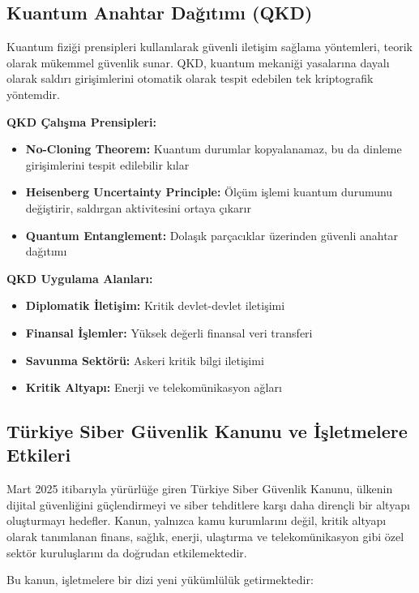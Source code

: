 \subsection{Kuantum Anahtar Dağıtımı (QKD)}

Kuantum fiziği prensipleri kullanılarak güvenli iletişim sağlama yöntemleri, teorik olarak mükemmel güvenlik sunar. QKD, kuantum mekaniği yasalarına dayalı olarak saldırı girişimlerini otomatik olarak tespit edebilen tek kriptografik yöntemdir.

\textbf{QKD Çalışma Prensipleri:}
\begin{itemize}
    \item \textbf{No-Cloning Theorem:} Kuantum durumlar kopyalanamaz, bu da dinleme girişimlerini tespit edilebilir kılar
    \item \textbf{Heisenberg Uncertainty Principle:} Ölçüm işlemi kuantum durumunu değiştirir, saldırgan aktivitesini ortaya çıkarır
    \item \textbf{Quantum Entanglement:} Dolaşık parçacıklar üzerinden güvenli anahtar dağıtımı
\end{itemize}

\textbf{QKD Uygulama Alanları:}
\begin{itemize}
    \item \textbf{Diplomatik İletişim:} Kritik devlet-devlet iletişimi
    \item \textbf{Finansal İşlemler:} Yüksek değerli finansal veri transferi
    \item \textbf{Savunma Sektörü:} Askeri kritik bilgi iletişimi
    \item \textbf{Kritik Altyapı:} Enerji ve telekomünikasyon ağları
\end{itemize}

\subsection{Türkiye Siber Güvenlik Kanunu ve İşletmelere Etkileri}

Mart 2025 itibarıyla yürürlüğe giren Türkiye Siber Güvenlik Kanunu, ülkenin dijital güvenliğini güçlendirmeyi ve siber tehditlere karşı daha dirençli bir altyapı oluşturmayı hedefler. Kanun, yalnızca kamu kurumlarını değil, kritik altyapı olarak tanımlanan finans, sağlık, enerji, ulaştırma ve telekomünikasyon gibi özel sektör kuruluşlarını da doğrudan etkilemektedir.

Bu kanun, işletmelere bir dizi yeni yükümlülük getirmektedir:

